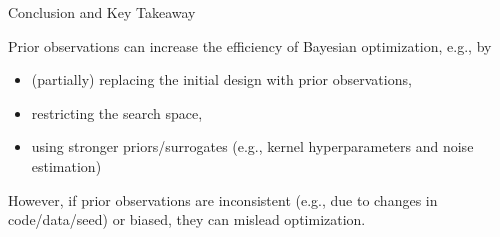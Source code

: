 \documentclass[main]{subfiles}
\begin{document}
\begin{frame}{Conclusion and Key Takeaway}

Prior observations can increase the efficiency of Bayesian optimization, e.g., by
\begin{itemize}
    \item (partially) replacing the initial design with prior observations,
    \item restricting the search space,
    \item using stronger priors/surrogates (e.g., kernel hyperparameters and noise estimation)
\end{itemize}

\vspace{0.5cm}
However, if prior observations are inconsistent (e.g., due to changes in code/data/seed) or biased, they can mislead optimization.

\end{frame}
\end{document}
